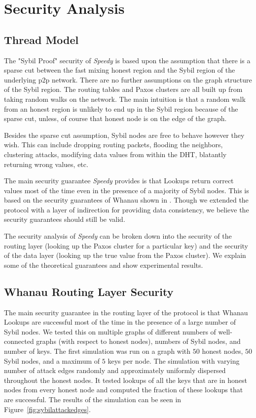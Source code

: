 \documentclass[letter]{article}
\newcommand{\sys}{\textit{Speedy}}
\begin{document}
\section{Security Analysis}

\subsection{Thread Model}
The "Sybil Proof" security of \sys{} is based upon the assumption that there is a sparse cut between the fast mixing honest region and the Sybil region of the underlying p2p network. There are no further assumptions on the graph structure of the Sybil region. The routing tables and Paxos clusters are all built up from taking random walks on the network. The main intuition is that a random walk from an honest region is unlikely to end up in the Sybil region because of the sparse cut, unless, of course that honest node is on the edge of the graph.

Besides the sparse cut assumption, Sybil nodes are free to behave however they wish. This can include dropping routing packets, flooding the neighbors, clustering attacks, modifying data values from within the DHT, blatantly returning wrong values, etc.

The main security guarantee \sys{} provides is that Lookups return correct values most of the time even in the presence of a majority of Sybil nodes. This is based on the security guarantees of Whanau shown in \cite{whanau}. Though we extended the protocol with a layer of indirection for providing data consistency, we believe the security guarantees should still be valid.

The security analysis of \sys{} can be broken down into the security of the routing layer (looking up the Paxos cluster for a particular key) and the security of the data layer (looking up the true value from the Paxos cluster). We explain some of the theoretical guarantees and show experimental results.

\subsection{Whanau Routing Layer Security}
The main security guarantee in the routing layer of the protocol is that Whanau Lookups are successful most of the time in the presence of a large number of Sybil nodes. We tested this on multiple graphs of different numbers of well-connected graphs (with respect to honest nodes), numbers of Sybil nodes, and number of keys. The first simulation was run on a graph with $50$ honest nodes, $50$ Sybil nodes, and a maximum of $5$ keys per node. The simulation with varying number of attack edges randomly and approximately uniformly dispersed throughout the honest nodes. It tested lookups of all the keys that are in honest nodes from every honest node and computed the fraction of these lookups that are successful. The results of the simulation can be seen in Figure~\ref{fig:sybilattackedges}. 
\end{document}
